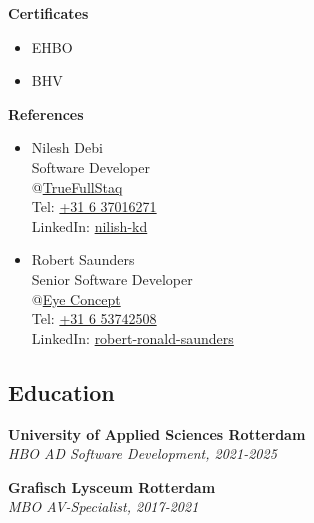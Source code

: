 \documentclass[11pt, twoside, a4paper, titlepage]{article}
\begin{document}
\begin{tcolorbox}[boxsep=0mm, left=0mm, right=0mm, top=0mm, bottom=0mm, height=23cm]
\begin{minipage}[t]{6.01cm}
\begin{tcolorbox}[colframe=black, colback=black, arc=0mm, sharp corners, fontupper=\color{white}, height=22.9cm]
			\vspace*{0.4cm}

			\textbf{Certificates}\\
			\begin{itemize}
				\item EHBO
				\item BHV
			\end{itemize}
			
			\vspace*{0.4cm}


			\textbf{References}\\
			\begin{itemize}
				\item{ Nilesh Debi\\
					Software Developer\\
					@\href{https://www.truefullstaq.com/}{TrueFullStaq}\\
					Tel: \href{tel:+31637016271}{+31 6 37016271}\\
					LinkedIn: \href{https://www.linkedin.com/in/nilesh-kd}{nilish-kd}}
				\item{ Robert Saunders\\
					Senior Software Developer\\
					@\href{https://www.eyeconcept.nl/}{Eye Concept}\\
					Tel: \href{tel:+31653742508}{+31 6 53742508}\\
					LinkedIn: \href{https://www.linkedin.com/in/robert-ronald-saunders}{robert-ronald-saunders}}
			\end{itemize}
		\end{tcolorbox}
	\end{minipage}
	\vspace*{-0.3cm}
	\begin{minipage}[t]{14cm}
		\begin{tcolorbox}[grow to left by=0.0cm, colframe=white, colback=white, height=22.9cm]
			\section*{Education}
			\textbf{University of Applied Sciences Rotterdam}\\
			\emph{HBO AD Software Development, 2021-2025}
			
			\vspace*{0.3cm}
			
			\textbf{Grafisch Lysceum Rotterdam}\\
			\emph{MBO AV-Specialist, 2017-2021}
			

\end{tcolorbox}
\end{minipage}
\end{tcolorbox}
\end{document}
